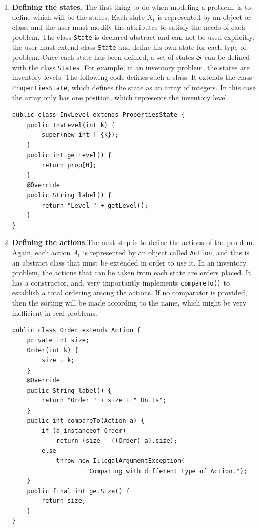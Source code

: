 \documentclass[11pt]{article}
\newcommand {\cA}{\ensuremath \mathcal{A}}
\newcommand {\cS}{\ensuremath \mathcal{S}}
\newcommand {\lil}{\lstinline}
\begin{document}
\begin{enumerate}
  \item \textbf{Defining the states}. The first thing to do when modeling a problem, is to define which will be the states. Each state $X_t$ is represented by an object or class, and the user must modify the attributes to satisfy the needs of each problem. The class \lstinline!State! is declared abstract and can not be used explicitly; the user must extend class \lstinline!State! and define his own state for each type of problem. Once each state has been defined, a set of states $\cS$ can be defined with the class \lstinline!States!. For example, in an inventory problem, the states are inventory levels. The following code defines such a class. It extends the class \lstinline!PropertiesState!, which defines the state as an array of integers. In this case the array only has one position, which represents the inventory level.

\begin{lstlisting}
public class InvLevel extends PropertiesState {
	public InvLevel(int k) {
		super(new int[] {k});
	}
	public int getLevel() {
		return prop[0];
	}
	@Override
	public String label() {
		return "Level " + getLevel();
	}
}
\end{lstlisting}

\item \textbf{Defining the actions}.The next step is to define the actions of the problem. Again, each action $A_t$ is represented by an object called \lstinline!Action!, and this is an abstract class that must be extended in order to use it. In an inventory problem, the actions that can be taken from each state are orders placed. %
It has a constructor, and, very importantly implements \lil!compareTo()! to establish a total ordering among the actions. If no comparator is provided, then the sorting will be made according to the name, which might be very inefficient in real problems.

\begin{lstlisting}
public class Order extends Action {
    private int size;
    Order(int k) {
        size = k;
    }
    @Override
    public String label() {
        return "Order " + size + " Units";
    }
    public int compareTo(Action a) {
        if (a instanceof Order)
            return (size - ((Order) a).size);
        else 
            throw new IllegalArgumentException(
                    "Comparing with different type of Action.");
    }
    public final int getSize() {
        return size;
    }
}
\end{lstlisting}


\end{enumerate}
\end{document}
